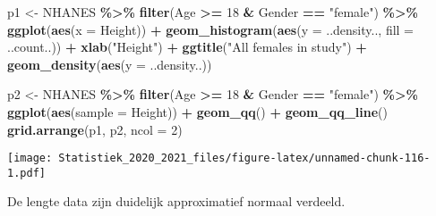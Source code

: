 \documentclass[
  12pt,dutch,coursenotes]{book}
\newenvironment{Shaded}{\begin{snugshade}}{\end{snugshade}}
\newcommand{\DataTypeTok}[1]{\textcolor[rgb]{0.13,0.29,0.53}{#1}}
\newcommand{\DecValTok}[1]{\textcolor[rgb]{0.00,0.00,0.81}{#1}}
\newcommand{\KeywordTok}[1]{\textcolor[rgb]{0.13,0.29,0.53}{\textbf{#1}}}
\newcommand{\NormalTok}[1]{#1}
\newcommand{\OperatorTok}[1]{\textcolor[rgb]{0.81,0.36,0.00}{\textbf{#1}}}
\newcommand{\StringTok}[1]{\textcolor[rgb]{0.31,0.60,0.02}{#1}}
\theoremstyle{definition}
\theoremstyle{definition}
\theoremstyle{definition}
\theoremstyle{remark}
\begin{document}
\begin{Shaded}
\begin{Highlighting}[]
\NormalTok{p1 \textless{}{-}}\StringTok{ }\NormalTok{NHANES }\OperatorTok{\%\textgreater{}\%}\StringTok{ }\KeywordTok{filter}\NormalTok{(Age }\OperatorTok{\textgreater{}=}\StringTok{ }\DecValTok{18} \OperatorTok{\&}\StringTok{ }\NormalTok{Gender }\OperatorTok{==}\StringTok{ "female"}\NormalTok{) }\OperatorTok{\%\textgreater{}\%}\StringTok{ }
\StringTok{    }\KeywordTok{ggplot}\NormalTok{(}\KeywordTok{aes}\NormalTok{(}\DataTypeTok{x =}\NormalTok{ Height)) }\OperatorTok{+}\StringTok{ }\KeywordTok{geom\_histogram}\NormalTok{(}\KeywordTok{aes}\NormalTok{(}\DataTypeTok{y =}\NormalTok{ ..density.., }
    \DataTypeTok{fill =}\NormalTok{ ..count..)) }\OperatorTok{+}\StringTok{ }\KeywordTok{xlab}\NormalTok{(}\StringTok{"Height"}\NormalTok{) }\OperatorTok{+}\StringTok{ }\KeywordTok{ggtitle}\NormalTok{(}\StringTok{"All females in study"}\NormalTok{) }\OperatorTok{+}\StringTok{ }
\StringTok{    }\KeywordTok{geom\_density}\NormalTok{(}\KeywordTok{aes}\NormalTok{(}\DataTypeTok{y =}\NormalTok{ ..density..))}

\NormalTok{p2 \textless{}{-}}\StringTok{ }\NormalTok{NHANES }\OperatorTok{\%\textgreater{}\%}\StringTok{ }\KeywordTok{filter}\NormalTok{(Age }\OperatorTok{\textgreater{}=}\StringTok{ }\DecValTok{18} \OperatorTok{\&}\StringTok{ }\NormalTok{Gender }\OperatorTok{==}\StringTok{ "female"}\NormalTok{) }\OperatorTok{\%\textgreater{}\%}\StringTok{ }
\StringTok{    }\KeywordTok{ggplot}\NormalTok{(}\KeywordTok{aes}\NormalTok{(}\DataTypeTok{sample =}\NormalTok{ Height)) }\OperatorTok{+}\StringTok{ }\KeywordTok{geom\_qq}\NormalTok{() }\OperatorTok{+}\StringTok{ }\KeywordTok{geom\_qq\_line}\NormalTok{()}
\KeywordTok{grid.arrange}\NormalTok{(p1, p2, }\DataTypeTok{ncol =} \DecValTok{2}\NormalTok{)}
\end{Highlighting}
\end{Shaded}

\texttt{[image: Statistiek\_2020\_2021\_files/figure-latex/unnamed-chunk-116-1.pdf]}

De lengte data zijn duidelijk approximatief normaal verdeeld.
\end{document}

